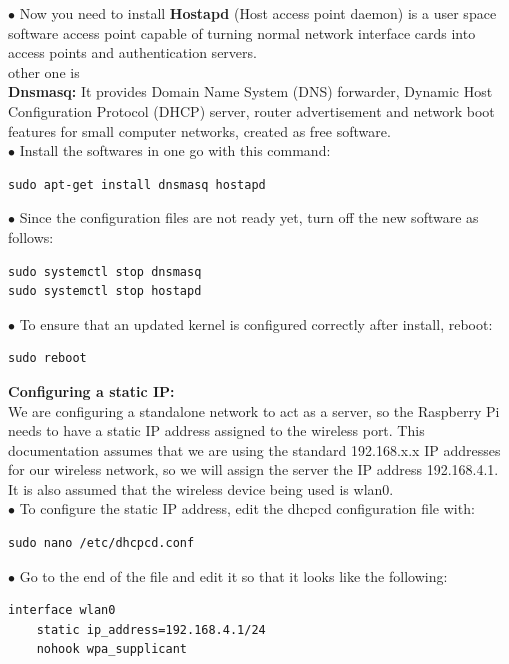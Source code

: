\documentclass[journal,12pt,onecolumn]{IEEEtran}
\begin{document}
\begin{flushleft}
$\bullet$ Now you need to install \textbf{Hostapd} (Host access point daemon) is a user space software access point capable of turning normal network interface cards into access points and authentication servers.\\
other one is\\
\medskip
\textbf{Dnsmasq:} It provides Domain Name System (DNS) forwarder, Dynamic Host Configuration Protocol (DHCP) server, router advertisement and network boot features for small computer networks, created as free software.\\
\medskip
$\bullet$ Install the softwares in one go with this command:\\
\bigskip
\begin{lstlisting}[frame=single,linewidth=10cm,breaklines=true]
sudo apt-get install dnsmasq hostapd
\end{lstlisting}
\bigskip
$\bullet$ Since the configuration files are not ready yet, turn off the new software as follows:\\
\medskip
\begin{lstlisting}[frame=single,linewidth=8cm,breaklines=true]
sudo systemctl stop dnsmasq
sudo systemctl stop hostapd
\end{lstlisting}
\bigskip
$\bullet$ To ensure that an updated kernel is configured correctly after install, reboot:\\
\medskip
\begin{lstlisting}[frame=single,linewidth=5cm,breaklines=true]
sudo reboot
\end{lstlisting}
\bigskip

\textbf{Configuring a static IP:} \\
\bigskip
We are configuring a standalone network to act as a server, so the Raspberry Pi needs to have a static IP address assigned to the wireless port. This documentation assumes that we are using the standard 192.168.x.x IP addresses for our wireless network, so we will assign the server the IP address 192.168.4.1. It is also assumed that the wireless device being used is wlan0. \\
\bigskip
$\bullet$ To configure the static IP address, edit the dhcpcd configuration file with: \\
\bigskip
\begin{lstlisting}[frame=single,linewidth=8cm,breaklines=true]
sudo nano /etc/dhcpcd.conf
\end{lstlisting}
\bigskip

$\bullet$ Go to the end of the file and edit it so that it looks like the following:\\
\bigskip
\begin{lstlisting}[frame=single,linewidth=10cm,breaklines=true]
interface wlan0
    static ip_address=192.168.4.1/24
    nohook wpa_supplicant
\end{lstlisting}
\bigskip


\end{flushleft}
\end{document}
